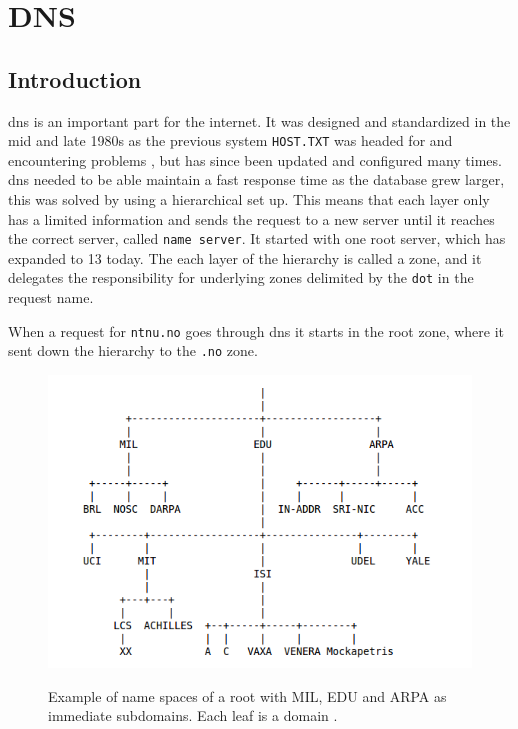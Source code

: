 \chapter{DNS}
\label{chp:dns}

\section{Introduction}

\Gls{dns} is an important part for the internet. It was designed and standardized in the mid and late 1980s as the previous system \texttt{HOST.TXT} was headed for and encountering problems \cite{Mockapetris:1988:DDN:52324.52338}, but has since been updated and configured many times. \Gls{dns} needed to be able maintain a fast response time as the database grew larger, this was solved by using a hierarchical set up. This means that each layer only has a limited information and sends the request to a new server until it reaches the correct server, called \texttt{name server}. It started with one root server, which has expanded to 13 today. The each layer of the hierarchy is called a zone, and it delegates the responsibility for underlying zones delimited by the \texttt{dot} in the request name.

When a request for \texttt{ntnu.no} goes through \Gls{dns} it starts in the root zone, where it sent down the hierarchy to the \texttt{.no} zone.

\begin{figure}
\centering
\includegraphics[scale=0.5]{figs/namespace_example.png}
\label{fig:namespace}
\caption{Example of name spaces of a root with MIL, EDU and ARPA as immediate subdomains. Each leaf is a domain \citep{mockapetris1987domain}.}
\end{figure}



